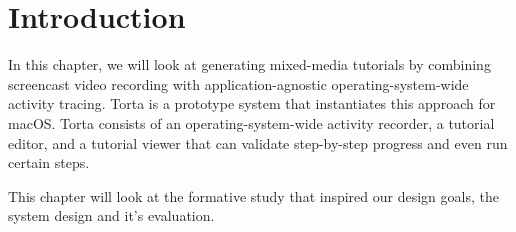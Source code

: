 \section{Introduction}
In this chapter, we will look at generating mixed-media tutorials 
by combining screencast video recording with application-agnostic
operating-system-wide activity tracing. Torta is a prototype system 
that instantiates this approach for macOS. Torta consists of an 
operating-system-wide activity recorder, a tutorial editor, and a 
tutorial viewer that can validate step-by-step progress and even 
run certain steps.

This chapter will look at the formative study that inspired our design goals, the system design and it's evaluation.